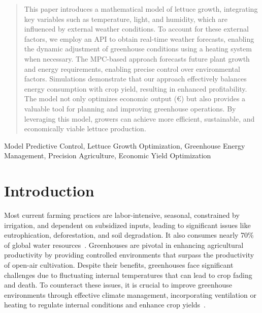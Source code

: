 \documentclass[conference]{IEEEtran}
\begin{document}
\begin{abstract}
    This paper introduces a mathematical model of lettuce growth, integrating key variables such as temperature, light, and humidity, which are influenced by external weather conditions. To account for these external factors, we employ an API to obtain real-time weather forecasts, enabling the dynamic adjustment of greenhouse conditions using a heating system when necessary. The MPC-based approach forecasts future plant growth and energy requirements, enabling precise control over environmental factors. Simulations demonstrate that our approach effectively balances energy consumption with crop yield, resulting in enhanced profitability. The model not only optimizes economic output (€) but also provides a valuable tool for planning and improving greenhouse operations.
    By leveraging this model, growers can achieve more efficient, sustainable, and economically viable lettuce production.
    \newline
\end{abstract}
\begin{IEEEkeywords}
    Model Predictive Control, Lettuce Growth Optimization, Greenhouse Energy Management, Precision Agriculture, Economic Yield Optimization
\end{IEEEkeywords}


\section{Introduction}
Most current farming practices are labor-intensive, seasonal, constrained by irrigation, and dependent on subsidized inputs, leading to significant issues like eutrophication, deforestation, and soil degradation. It also consumes nearly 70\% of global water resources~\cite{Debroy2024}. Greenhouses are pivotal in enhancing agricultural productivity by providing controlled environments that surpass the productivity of open-air cultivation. Despite their benefits, greenhouses face significant challenges due to fluctuating internal temperatures that can lead to crop fading and death. To counteract these issues, it is crucial to improve greenhouse environments through effective climate management, incorporating ventilation or heating to regulate internal conditions and enhance crop yields~\cite{Wu2019}.
\end{document}

